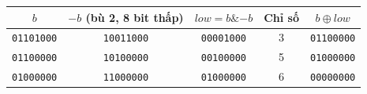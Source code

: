 \begin{tabular}{@{}ccccc@{}}
\toprule
$b$ & $-b$ (bù 2, 8 bit thấp) & $low = b \mathbin{\&} -b$ & \textbf{Chỉ số} & $b \oplus low$ \\
\midrule
\texttt{01101000} & \texttt{10011000} & \texttt{00001000} & 3 & \texttt{01100000} \\
\texttt{01100000} & \texttt{10100000} & \texttt{00100000} & 5 & \texttt{01000000} \\
\texttt{01000000} & \texttt{11000000} & \texttt{01000000} & 6 & \texttt{00000000} \\
\bottomrule
\end{tabular}
